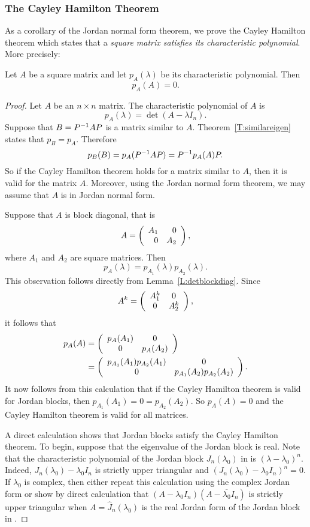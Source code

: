 \documentclass{ximera}
\begin{document}
\subsubsection*{The Cayley Hamilton Theorem}

As a corollary of the Jordan normal form theorem, we prove the Cayley 
Hamilton theorem which states that a {\em square matrix satisfies its 
characteristic polynomial\/}.  More precisely:
\begin{theorem} \label{T:CH} 
Let $A$ be a square matrix and let $p_A(\lambda)$ be 
its characteristic polynomial.  Then
\[
p_A(A) = 0.
\]
\end{theorem}

\begin{proof}  Let $A$ be an $n\times n$ matrix.  The characteristic polynomial of 
$A$ is
\[
p_A(\lambda)=\det(A-\lambda I_n).
\]
Suppose that $B=P^{-1} AP$ is a matrix similar to $A$.  
Theorem~\ref{T:similareigen} states that $p_B=p_A$.  Therefore
\[
p_B(B)= p_A(P^{-1} AP) = P^{-1} p_A(A)P.
\]
So if the Cayley Hamilton theorem holds for a matrix similar to $A$, 
then it is valid for the matrix $A$.  Moreover, using the Jordan normal form 
theorem, we may assume that $A$ is in Jordan normal form.  

Suppose that $A$ is block diagonal, that is 
\[
A = \left(\begin{array}{rr} A_1 & 0\\ 0 &A_2\end{array}\right),
\]
where $A_1$ and $A_2$ are square matrices.  Then 
\[
p_A(\lambda) = p_{A_1}(\lambda)p_{A_2}(\lambda).
\]
This observation follows directly from Lemma~\ref{L:detblockdiag}.  Since
\[
A^k = \left(\begin{array}{cc} A_1^k & 0\\ 0 &A_2^k\end{array}\right),
\]
it follows that 
\begin{align*}
p_A(A) &= \left(\begin{array}{cc} p_A(A_1) & 0\\ 0 &p_A(A_2)\end{array}\right) \\
  &= \left(\begin{array}{cc} p_{A_1}(A_1)p_{A_2}(A_1) & 0\\ 0 &p_{A_1}(A_2)p_{A_2}(A_2)\end{array}\right).
\end{align*}
It now follows from this calculation that if the Cayley Hamilton theorem is 
valid for Jordan blocks, then $p_{A_1}(A_1)=0=p_{A_2}(A_2)$.  So $p_A(A)=0$ 
and the Cayley Hamilton theorem is valid for all matrices.

A direct calculation shows that Jordan blocks satisfy the 
Cayley Hamilton theorem.  To begin, suppose that the eigenvalue of the 
Jordan block is real.  Note that the characteristic polynomial of 
the Jordan block $J_n(\lambda_0)$ in  is $(\lambda-\lambda_0)^n$.
Indeed, $J_n(\lambda_0)-\lambda_0I_n$ is strictly upper triangular and 
$(J_n(\lambda_0)-\lambda_0I_n)^n=0$.  If $\lambda_0$ is complex, then either
repeat this calculation using the complex Jordan form or show by direct 
calculation that $(A-\lambda_0I_n)(A-\overline{\lambda_0}I_n)$ is strictly 
upper triangular when $A=\widehat{J}_n(\lambda_0)$ is the real Jordan form of 
the Jordan block in .  \end{proof}
\end{document}
